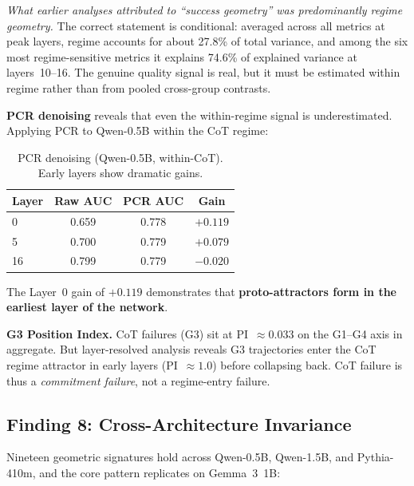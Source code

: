 \documentclass[11pt,twocolumn]{article}
\newcommand{\groupthree}{\textsc{G3}}
\begin{document}
\emph{What earlier analyses attributed to ``success geometry'' was predominantly regime geometry.} The correct statement is conditional: averaged across all metrics at peak layers, regime accounts for about 27.8\% of total variance, and among the six most regime-sensitive metrics it explains 74.6\% of explained variance at layers~10--16. The genuine quality signal is real, but it must be estimated within regime rather than from pooled cross-group contrasts.

\textbf{PCR denoising} reveals that even the within-regime signal is underestimated. Applying PCR to Qwen-0.5B within the CoT regime:

\begin{table}[h]
\centering
\small
\begin{tabular}{lccc}
\toprule
\textbf{Layer} & \textbf{Raw AUC} & \textbf{PCR AUC} & \textbf{Gain} \\
\midrule
0 & 0.659 & 0.778 & $+0.119$ \\
5 & 0.700 & 0.779 & $+0.079$ \\
16 & 0.799 & 0.779 & $-0.020$ \\
\bottomrule
\end{tabular}
\caption{PCR denoising (Qwen-0.5B, within-CoT). Early layers show dramatic gains.}
\label{tab:pcr_qwen}
\end{table}

The Layer~0 gain of $+0.119$ demonstrates that \textbf{proto-attractors form in the earliest layer of the network}.

\textbf{G3 Position Index.} CoT failures (\groupthree) sit at PI~$\approx 0.033$ on the G1--G4 axis in aggregate. But layer-resolved analysis reveals G3 trajectories enter the CoT regime attractor in early layers (PI~$\approx 1.0$) before collapsing back. CoT failure is thus a \emph{commitment failure}, not a regime-entry failure.

\subsection{Finding 8: Cross-Architecture Invariance}
\label{sec:finding8}

Nineteen geometric signatures hold across Qwen-0.5B, Qwen-1.5B, and Pythia-410m, and the core pattern replicates on Gemma~3~1B:
\end{document}
